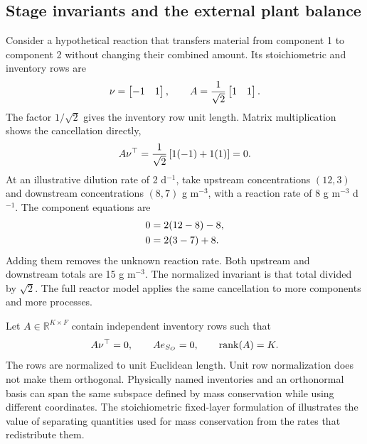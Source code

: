 \subsection{Stage invariants and the external plant balance}

Consider a hypothetical reaction that transfers material from component 1 to component 2 without changing their combined amount. Its stoichiometric and inventory rows are
\begin{equation}
\equationname{Illustrative stoichiometric matrix and normalized invariant row}
\nu=\begin{bmatrix}-1&1\end{bmatrix},\qquad
A=\frac1{\sqrt2}\begin{bmatrix}1&1\end{bmatrix}.
\end{equation}
The factor $1/\sqrt2$ gives the inventory row unit length. Matrix multiplication shows the cancellation directly,
\begin{equation}
\equationname{Illustrative cancellation of the reaction contribution to an invariant}
A\nu^\top=\frac1{\sqrt2}\left[1(-1)+1(1)\right]=0.
\end{equation}
At an illustrative dilution rate of 2 d$^{-1}$, take upstream concentrations $(12,3)$ and downstream concentrations $(8,7)$ g m$^{-3}$, with a reaction rate of 8 g m$^{-3}$ d$^{-1}$. The component equations are
\begin{align}
\equationname{Illustrative steady-state equation for the consumed component}
0&=2(12-8)-8,\\
\equationname{Illustrative steady-state equation for the produced component}
0&=2(3-7)+8.
\end{align}
Adding them removes the unknown reaction rate. Both upstream and downstream totals are 15 g m$^{-3}$. The normalized invariant is that total divided by $\sqrt2$. The full reactor model applies the same cancellation to more components and more processes.

Let $A\in\mathbb R^{K\times F}$ contain independent inventory rows such that
\begin{equation}
\equationname{Reaction, oxygen-forcing, and rank identities of the plant invariant operator}
A\nu^\top=0,\qquad Ae_{S_O}=0,\qquad
\operatorname{rank}(A)=K.
\label{eq:plant_invariant_operator}
\end{equation}
The rows are normalized to unit Euclidean length. Unit row normalization does not make them orthogonal. Physically named inventories and an orthonormal basis can span the same subspace defined by mass conservation while using different coordinates. The stoichiometric fixed-layer formulation of \citet{SturmWexler2022} illustrates the value of separating quantities used for mass conservation from the rates that redistribute them.


